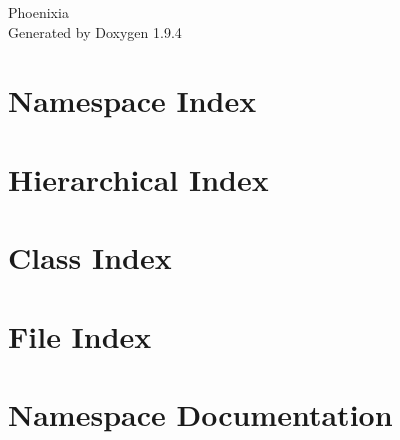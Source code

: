 \documentclass[twoside]{book}
\newcommand{\+}{\discretionary{\mbox{\scriptsize$\hookleftarrow$}}{}{}}
\newcommand{\clearemptydoublepage}{%
    \newpage{\pagestyle{empty}\cleardoublepage}%
  }
\begin{document}
  \raggedbottom
    \hypersetup{pageanchor=false,
                bookmarksnumbered=true,
                pdfencoding=unicode
               }
  \begin{titlepage}
  \vspace*{7cm}
  \begin{center}%
  {\Large Phoenixia}\\
  \vspace*{1cm}
  {\large Generated by Doxygen 1.9.4}\\
  \end{center}
  \end{titlepage}
  \clearemptydoublepage
  \tableofcontents
  \clearemptydoublepage
  \hypersetup{pageanchor=true}
\chapter{Namespace Index}

\chapter{Hierarchical Index}

\chapter{Class Index}

\chapter{File Index}

\chapter{Namespace Documentation}











\end{document}
